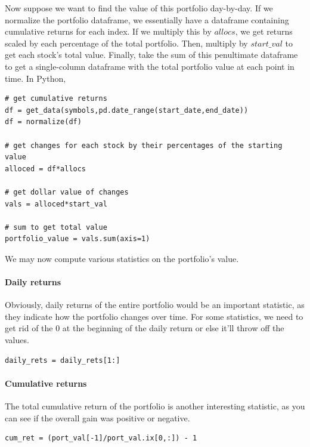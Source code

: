 \noindent Now suppose we want to find the value of this portfolio day-by-day. If we normalize the portfolio dataframe, we essentially have a dataframe containing cumulative returns for each index. If we multiply this by $allocs$, we get returns scaled by each percentage of the total portfolio. Then, multiply by $start\_val$ to get each stock's total value. Finally, take the sum of this penultimate dataframe to get a single-column dataframe with the total portfolio value at each point in time. In Python,

\noindent\begin{minipage}{\linewidth}
\begin{lstlisting}[style=python]
# get cumulative returns
df = get_data(symbols,pd.date_range(start_date,end_date))
df = normalize(df)

# get changes for each stock by their percentages of the starting value
alloced = df*allocs

# get dollar value of changes
vals = alloced*start_val

# sum to get total value
portfolio_value = vals.sum(axis=1)
\end{lstlisting}
\end{minipage}

\noindent We may now compute various statistics on the portfolio's value.

\paragraph{Daily returns} Obviously, daily returns of the entire portfolio would be an important statistic, as they indicate how the portfolio changes over time. For some statistics, we need to get rid of the 0 at the beginning of the daily return or else it'll throw off the values.

\begin{lstlisting}[style=python]
daily_rets = daily_rets[1:]
\end{lstlisting}

\paragraph{Cumulative returns} The total cumulative return of the portfolio is another interesting statistic, as you can see if the overall gain was positive or negative.
\begin{lstlisting}[style=python]
cum_ret = (port_val[-1]/port_val.ix[0,:]) - 1
\end{lstlisting}

